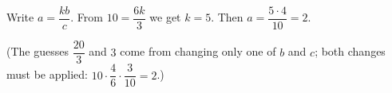 Write $a=\dfrac{kb}{c}$. From $10=\dfrac{6k}{3}$ we get $k=5$. Then $a=\dfrac{5\cdot4}{10}=\boxed{2}$.

(The guesses $\dfrac{20}{3}$ and $3$ come from changing only one of $b$ and $c$; both changes must be applied: $10\cdot\dfrac{4}{6}\cdot\dfrac{3}{10}=2$.)
